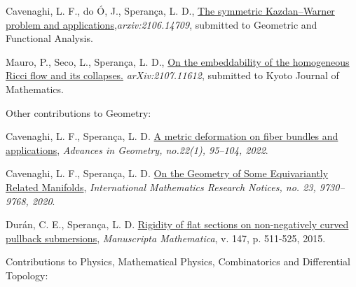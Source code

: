 \documentclass[10pt]{article}
\newenvironment{innerlist}[1][\enskip\textbullet]%
{\begin{compactitem}[#1]}{\end{compactitem}}
\begin{document}
\begin{enumerate}[$\star$]
\begin{innerlist}[-]
		
		
		\item Cavenaghi, L. F., do Ó, J., Sperança, L. D., \href{https://arxiv.org/abs/2106.14709}{The symmetric Kazdan--Warner problem and applications},\textit{{arxiv:2106.14709}}, submitted to Geometric and Functional Analysis.
		
		
		
		
		\item  Mauro, P., Seco, L., Sperança, L. D., \href{https://arxiv.org/abs/2107.11612}{On the embeddability of the homogeneous Ricci flow and its collapses.} \textit{{arXiv:2107.11612}}, submitted to  Kyoto Journal of Mathematics.
		
		
		
		\end{innerlist}
		
		
		\item 
		Other contributions to Geometry:
		
		
		\begin{innerlist}[-]
					\item Cavenaghi, L. F., Sperança, L. D. \href{https://doi.org/10.1515/advgeom-2021-0007}{A metric deformation on fiber bundles and applications},  \textit{Advances in Geometry, no.22(1), 95--104, 2022}.
			
			
			\item Cavenaghi, L. F., Sperança, L. D. \href{https://academic.oup.com/imrn/advance-article-abstract/doi/10.1093/imrn/rny268/5194089}{On the Geometry of Some Equivariantly Related Manifolds},  	\textit{ {International Mathematics Research Notices, no. 23, 9730–9768, 2020}}.
			
			
			
			\item Durán, C. E., Sperança, L. D. \href{https://link.springer.com/article/10.1007/s00229-015-0731-0}{Rigidity of flat sections on non-negatively curved pullback submersions}, {\textit{Manuscripta Mathematica}, v. 147, p. 511-525, 2015}.

			
			
			
			
			
		\end{innerlist}
		
		\item Contributions to Physics, Mathematical Physics, Combinatorics and Differential Topology:
		
		\begin{innerlist}[-]
	

\end{innerlist}
\end{enumerate}
\end{document}

